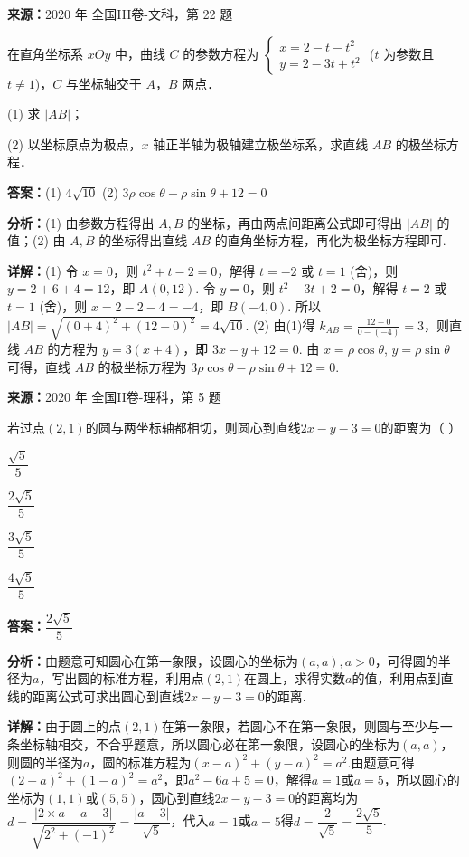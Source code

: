\begin{question}[points=10]
\textbf{来源：}2020 年 全国III卷-文科，第 22 题\par
[选修4-4：坐标系与参数方程]

在直角坐标系 $xOy$ 中，曲线 $C$ 的参数方程为 $\begin{cases} x=2-t-t^2 \\ y=2-3t+t^2 \end{cases}$ ($t$ 为参数且 $t\neq1$)，$C$ 与坐标轴交于 $A$，$B$ 两点．

(1) 求 $|AB|$；

(2) 以坐标原点为极点，$x$ 轴正半轴为极轴建立极坐标系，求直线 $AB$ 的极坐标方程．
\begin{solution}
\textbf{答案：}(1) $4\sqrt{10}$ (2) $3\rho\cos\theta-\rho\sin\theta+12=0$

\textbf{分析：}(1) 由参数方程得出 $A,B$ 的坐标，再由两点间距离公式即可得出 $|AB|$ 的值；(2) 由 $A,B$ 的坐标得出直线 $AB$ 的直角坐标方程，再化为极坐标方程即可.

\textbf{详解：}(1) 令 $x=0$，则 $t^2+t-2=0$，解得 $t=-2$ 或 $t=1$ (舍)，则 $y=2+6+4=12$，即 $A(0,12)$. 令 $y=0$，则 $t^2-3t+2=0$，解得 $t=2$ 或 $t=1$ (舍)，则 $x=2-2-4=-4$，即 $B(-4,0)$. 所以 $|AB|=\sqrt{(0+4)^2+(12-0)^2}=4\sqrt{10}$.
(2) 由(1)得 $k_{AB}=\frac{12-0}{0-(-4)}=3$，则直线 $AB$ 的方程为 $y=3(x+4)$，即 $3x-y+12=0$. 由 $x=\rho\cos\theta$, $y=\rho\sin\theta$ 可得，直线 $AB$ 的极坐标方程为 $3\rho\cos\theta-\rho\sin\theta+12=0$.
\end{solution}
\end{question}

\begin{question}[points=5]
\textbf{来源：}2020 年 全国II卷-理科，第 5 题\par
若过点$(2,1)$的圆与两坐标轴都相切，则圆心到直线$2x-y-3=0$的距离为（ ）
\begin{choices}
  \item $\dfrac{\sqrt5}{5}$
  \item $\dfrac{2\sqrt5}{5}$
  \item $\dfrac{3\sqrt5}{5}$
  \item $\dfrac{4\sqrt5}{5}$
\end{choices}
\begin{solution}
\textbf{答案：}$\dfrac{2\sqrt5}{5}$

\textbf{分析：}由题意可知圆心在第一象限，设圆心的坐标为$(a,a),a>0$，可得圆的半径为$a$，写出圆的标准方程，利用点$(2,1)$在圆上，求得实数$a$的值，利用点到直线的距离公式可求出圆心到直线$2x-y-3=0$的距离.

\textbf{详解：}由于圆上的点$(2,1)$在第一象限，若圆心不在第一象限，则圆与至少与一条坐标轴相交，不合乎题意，所以圆心必在第一象限，设圆心的坐标为$(a,a)$，则圆的半径为$a$，圆的标准方程为$(x-a)^2+(y-a)^2=a^2$.由题意可得$(2-a)^2+(1-a)^2=a^2$，即$a^2-6a+5=0$，解得$a=1$或$a=5$，所以圆心的坐标为$(1,1)$或$(5,5)$，圆心到直线$2x-y-3=0$的距离均为$d=\dfrac{|2\times a - a -3|}{\sqrt{2^2+(-1)^2}}=\dfrac{|a-3|}{\sqrt5}$，代入$a=1$或$a=5$得$d=\dfrac{2}{\sqrt5}=\dfrac{2\sqrt5}{5}$.
\end{solution}
\end{question}

